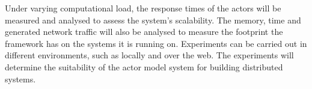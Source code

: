 \documentclass[12pt]{report}
\begin{document}
Under varying computational load, the response times of the actors will be measured and analysed to assess the system’s scalability. The memory, time and generated network traffic will also be analysed to measure the footprint the framework has on the systems it is running on. Experiments can be carried out in different environments, such as locally and over the web. The experiments will determine the suitability of the actor model system for building distributed systems.


\end{document}
